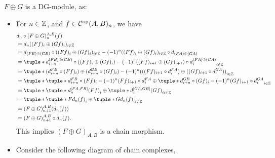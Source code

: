 \begin{remark}
    \( F \oplus G \) is a DG-module, as:
    \begin{itemize}
        \item {
            For \( n \in {\mathbb{Z}} \), and \( f \in {\mathcal{C}}^{\operatorname{op}}(A, B)_n \), we have
            \begin{align*}
                &d_n \circ (F \oplus G)_n^{A, B} (f) \\
                &= d_n ((F f)_i \oplus (G f)_i)_{i \in \Zb} \\
                &= d_{(F B) \oplus (G B)} \circ ((F f)_i \oplus (G f)_i)_{i \in \Zb} - (-1)^n ((F f)_i \oplus (G f)_i)_{i \in \Zb} \circ d_{(F A) \oplus (G A)} \\
                &= \tuple*{d_{i + n}^{(F B) \oplus (G B)} \circ ((F f)_i \oplus (G f)_i) - (-1)^n ((F f)_{i + 1} \oplus (G f)_{i + 1}) \circ d_i^{(F A) \oplus (G A)}}_{i \in \Zb} \\
                &= \tuple*{ (d_{i + n}^{F B} \circ (F f)_i) \oplus (d_{i + n}^{G B} \circ (G f)_i) - (-1)^n ( ( (F f)_{i + 1} \circ d_i^{F A} ) \oplus ( (G f)_{i + 1} \circ d_i^{G A} ) ) }_{i \in \Zb} \\
                &= \tuple*{ \tuple*{d_{i + n}^{F B} \circ (F f)_i - (-1)^n (F f)_{i + 1} \circ d_i^{F A}} \oplus \tuple*{d_{i + n}^{G B} \circ (G f)_i - (-1)^n (G f)_{i + 1} \circ d_i^{G A}} }_{i \in \Zb} \\
                &= \tuple*{ \tuple*{d_n^{[F A, F B]} (F f)}_i \oplus \tuple*{ d_n^{[G A, G B]} (G f)}_i }_{i \in \Zb} \\
                &= \tuple*{ \tuple*{F d_n (f)}_i \oplus \tuple*{ G d_n (f)}_i }_{i \in \Zb} \\
                &= (F \oplus G)_{n + 1}^{A, B} (d_n (f)) \\
                &= (F \oplus G)_{n + 1}^{A, B} \circ d_n (f).
            \end{align*}
            This implies \( (F \oplus G)_{A, B} \) is a chain morphism.
        }
        \item {
            Consider the following diagram of chain complexes,
            \begin{center}
\end{center}}
\end{itemize}
\end{remark}
